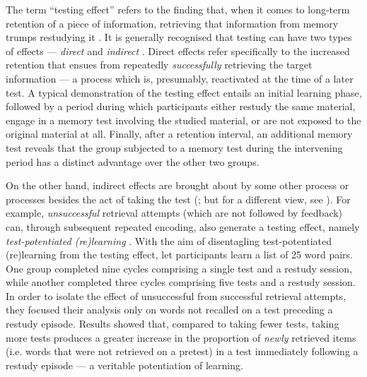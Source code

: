 \documentclass[../main.tex]{subfiles}
\begin{document}
The term ``testing effect'' refers to the finding that, when it comes to long-term retention of a piece of information, retrieving that information from memory trumps restudying it \citep{karpickeCriticalImportanceRetrieval2008,roedigeriiiPowerTestingMemory2006, roedigeriiiTestEnhancedLearningTaking2006, rowlandEffectTestingRestudy2014, adesopeRethinkingUseTests2017, roedigeriiiCriticalRoleRetrieval2011, gloverTestingPhenomenonNot1989}. It is generally recognised that testing can have two types of effects --- \textit{direct} and \textit{indirect} \citep{arnoldTestpotentiatedLearningDistinguishing2013, roedigeriiiPowerTestingMemory2006}. Direct effects refer specifically to the increased retention that ensues from repeatedly \textit{successfully} retrieving the target information --- a process which is, presumably, reactivated at the time of a later test. A typical demonstration of the testing effect entails an initial learning phase, followed by a period during which participants either restudy the same material, engage in a memory test involving the studied material, or are not exposed to the original material at all. Finally, after a retention interval, an additional memory test reveals that the group subjected to a memory test during the intervening period has a distinct advantage over the other two groups. 

On the other hand, indirect effects are brought about by some other process or 
processes besides the act of taking the test 
(\citealp{roedigeriiiPowerTestingMemory2006}; but for a different view, see 
\citealp{kornellRetrievalAttemptsEnhance2015}). For example, 
\textit{unsuccessful} retrieval attempts (which are not followed by feedback) 
can, through subsequent repeated encoding, also generate a testing effect, 
namely \textit{test-potentiated (re)learning} 
\citep{izawaReinforcementTestSequencesPairedAssociate1966,izawaOptimalPotentiatingEffects1970,
 kornellUnsuccessfulRetrievalAttempts2009, arnoldFreeRecallEnhances2013, 
arnoldTestpotentiatedLearningDistinguishing2013, 
wissmanTestpotentiatedLearningThree2018}. With the aim of disentagling 
test-potentiated (re)learning from the testing effect, 
\cite{arnoldTestpotentiatedLearningDistinguishing2013} let participants learn a 
list of 25 word pairs. One group completed nine cycles comprising a single test 
and a restudy session, while another completed three cycles comprising five 
tests and a restudy session. In order to isolate the effect of unsuccessful 
from successful retrieval attempts, they focused their analysis only on words 
not recalled on a test preceding a restudy episode. Results showed that, 
compared to taking fewer tests, taking more tests produces a greater increase 
in the proportion of \textit{newly} retrieved items (i.e. words that were not 
retrieved on a pretest) in a test immediately following a restudy episode --- a 
veritable potentiation of learning.
\end{document}
